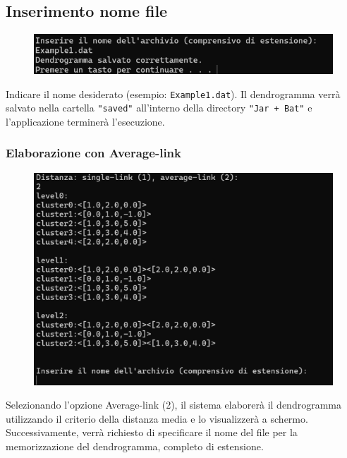 \subsection{Inserimento nome file}

\begin{figure}[h!]
    \centering
    \includegraphics[width=\textwidth]{images/inserimento_nome_file.png}
\end{figure}

Indicare il nome desiderato (esempio: \texttt{Example1.dat}). Il dendrogramma verrà salvato nella cartella \texttt{"saved"} all'interno della directory \texttt{"Jar + Bat"} e l'applicazione terminerà l'esecuzione.

\subsubsection{Elaborazione con Average-link}

\begin{figure}[h!]
    \centering
    \includegraphics[width=\textwidth]{images/scelta_averageLink.png}
\end{figure}

Selezionando l'opzione Average-link (2), il sistema elaborerà il dendrogramma utilizzando il criterio della distanza media e lo visualizzerà a schermo. Successivamente, verrà richiesto di specificare il nome del file per la memorizzazione del dendrogramma, completo di estensione.


